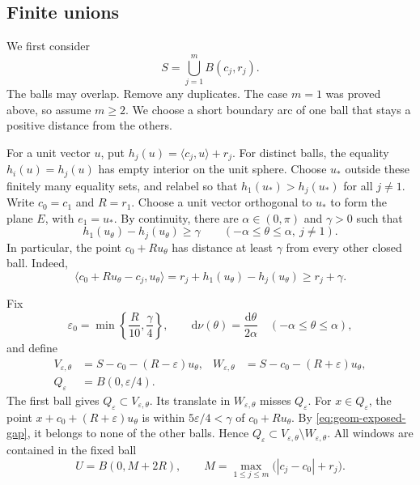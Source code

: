 \documentclass[10pt,a4paper]{amsart}
\def\d{\mathrm{d}}
\newcommand\inpro[2]{\langle #1,#2\rangle}
\newcommand\1{\mathbbm{1}}
\newcommand{\eps}{\varepsilon}
\def\d{\mathrm{d}}
\begin{document}
\subsection{Finite unions}

We first consider
\begin{equation*}
    S=\bigcup_{j=1}^{m}B(c_j,r_j).
\end{equation*}
The balls may overlap. Remove any duplicates.
The case $m=1$ was proved above, so assume $m\ge2$.
We choose a short boundary arc of one ball that stays a positive distance
from the others.

For a unit vector $u$, put $h_j(u)=\inpro{c_j}{u}+r_j$.
For distinct balls, the equality $h_i(u)=h_j(u)$ has empty interior on the
unit sphere. Choose $u_*$ outside these finitely many equality sets, and
relabel so that $h_1(u_*)>h_j(u_*)$ for all $j\ne1$.
Write $c_0=c_1$ and $R=r_1$. Choose a unit vector orthogonal to $u_*$ to form
the plane $E$, with $e_1=u_*$. By continuity, there are $\alpha\in(0,\pi)$
and $\gamma>0$ such that
\begin{equation}\label{eq:geom-exposed-gap}
    h_1(u_\theta)-h_j(u_\theta)\ge\gamma
    \qquad(-\alpha\le\theta\le\alpha,\ j\ne1).
\end{equation}
In particular, the point $c_0+Ru_\theta$ has distance at least $\gamma$
from every other closed ball. Indeed,
\begin{equation*}
    \inpro{c_0+Ru_\theta-c_j}{u_\theta}
    =r_j+h_1(u_\theta)-h_j(u_\theta)\ge r_j+\gamma.
\end{equation*}

Fix
\begin{equation*}
    \eps_0=\min\left\{\frac R{10},\frac\gamma4\right\},
    \qquad \d\nu(\theta)=\frac{\d\theta}{2\alpha}
    \quad(-\alpha\le\theta\le\alpha),
\end{equation*}
and define
\begin{equation}\label{eq:geom-union-windows}
    \begin{aligned}
        V_{\eps,\theta}&=S-c_0-(R-\eps)u_\theta,
        &W_{\eps,\theta}&=S-c_0-(R+\eps)u_\theta,\\
        Q_\eps&=B(0,\eps/4).
    \end{aligned}
\end{equation}
The first ball gives $Q_\eps\subset V_{\eps,\theta}$.
Its translate in $W_{\eps,\theta}$ misses $Q_\eps$.
For $x\in Q_\eps$, the point $x+c_0+(R+\eps)u_\theta$ is within
$5\eps/4<\gamma$ of $c_0+Ru_\theta$. By \eqref{eq:geom-exposed-gap},
it belongs to none of the other balls. Hence
$Q_\eps\subset V_{\eps,\theta}\setminus W_{\eps,\theta}$.
All windows are contained in the fixed ball
\begin{equation*}
    U=B(0,M+2R),\qquad
    M=\max_{1\le j\le m}\bigl(|c_j-c_0|+r_j\bigr).
\end{equation*}
\end{document}
